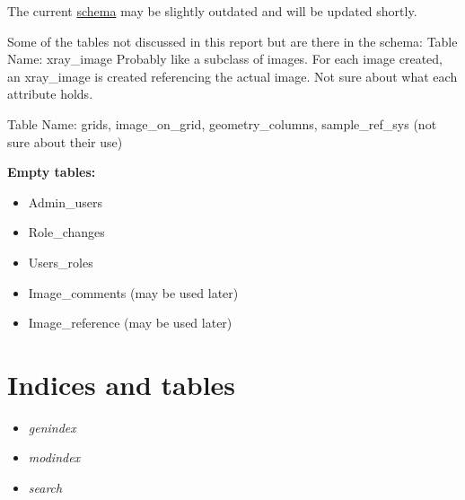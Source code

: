 \documentclass[letterpaper,10pt,english]{sphinxmanual}
\begin{document}
The current \href{https://github.com/metpetdb/metpetdb/tree/master/mpdb-server/schema}{schema} may be slightly outdated and will be updated shortly.

Some of the tables not discussed in this report but are there in the schema:
Table Name: xray\_image
Probably like a subclass of images. For each image created, an xray\_image is created referencing the actual image. Not sure about what each attribute holds.

Table Name: grids, image\_on\_grid, geometry\_columns, sample\_ref\_sys (not sure about their use)

\textbf{Empty tables:}
\begin{itemize}
\item {} 
Admin\_users

\item {} 
Role\_changes

\item {} 
Users\_roles

\item {} 
Image\_comments (may be used later)

\item {} 
Image\_reference (may be used later)

\end{itemize}


\chapter{Indices and tables}
\label{index:indices-and-tables}\begin{itemize}
\item {} 
\emph{genindex}

\item {} 
\emph{modindex}

\item {} 
\emph{search}

\end{itemize}



\renewcommand{\indexname}{Index}
\printindex
\end{document}
